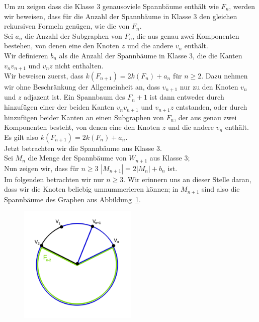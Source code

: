 Um zu zeigen dass die Klasse 3 genausoviele Spannbäume enthält wie $F_n$, werden wir beweisen, dass für die Anzahl der Spannbäume in Klasse 3 den gleichen rekursiven Formeln genügen, wie die von $F_n$.\\
Sei $a_n$ die Anzahl der Subgraphen von $F_n$, die aus genau zwei Komponenten bestehen, von denen eine den Knoten $z$ und die andere $v_n$ enthält.\\
Wir definieren $b_n$ als die Anzahl der Spannbäume in Klasse 3, die die Kanten $v_nv_{n+1}$ und $v_nz$ nicht enthalten.\\
Wir beweisen zuerst, dass $\mathit{k}\left(F_{n+1}\right)=2\mathit{k}\left(F_{n}\right)+a_n$ für $n\geq 2$.
Dazu nehmen wir ohne Beschränkung der Allgemeinheit an, dass $v_{n+1}$ nur zu den Knoten $v_n$ und $z$ adjazent ist. Ein Spannbaum des $F_n+1$ ist dann entweder durch hinzufügen einer der beiden Kanten $v_nv_{n+1}$ und $v_{n+1}z$ entstanden, oder durch hinzufügen beider Kanten an einen Subgraphen von $F_n$, der aus genau zwei Komponenten besteht, von denen eine den Knoten $z$ und die andere $v_n$ enthält.\\
Es gilt also $\mathit{k}\left(F_{n+1}\right)=2\mathit{k}\left(F_{n}\right)+a_n$.\\
Jetzt betrachten wir die Spannbäume aus Klasse 3.\\
Sei $M_n$ die Menge der Spannbäume von $W_{n+1}$ aus Klasse 3;\\
Nun zeigen wir, dass für $n \geq 3$ $|M_{n+1}|=2|M_n|+b_n$ ist.\\
Im folgenden betrachten wir nur $n \geq 3$. Wir erinnern uns an dieser Stelle daran, dass wir die Knoten beliebig umnummerieren können; in $M_{n+1}$ sind also die Spannbäume des Graphen aus Abbildung~\ref{mn1}.
\begin{figure}[H]
  \centering
 \includegraphics[width=0.5\textwidth]{mn1.png}
 \caption{}
 \label{mn1} %
\end{figure}
